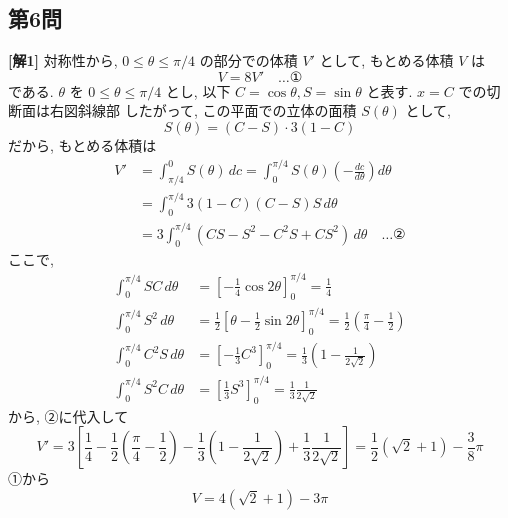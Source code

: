 \documentclass[../main.tex]{subfiles}
\begin{document}
\newpage

\subsection*{第6問}

\noindent
\textbf{[解1]} 対称性から, $0 \le \theta \le \pi/4$ の部分での体積 $V'$ として, もとめる体積 $V$ は
\[
  V = 8V' \quad \dots \text{①}
\]
である. $\theta$ を $0 \le \theta \le \pi/4$ とし, 以下 $C = \cos\theta, S = \sin\theta$ と表す. $x = C$ での切断面は右図斜線部
したがって, この平面での立体の面積 $S(\theta)$ として,
\[
  S(\theta) = (C - S) \cdot 3(1-C)
\]
だから, もとめる体積は
\begin{align*}
  V' &= \int_{\pi/4}^0 S(\theta) \, dc = \int_0^{\pi/4} S(\theta) \left( -\frac{dc}{d\theta} \right) d\theta \\
  &= \int_0^{\pi/4} 3(1-C)(C-S) S \, d\theta \\
  &= 3 \int_0^{\pi/4} (CS - S^2 - C^2 S + CS^2) \, d\theta \quad \dots \text{②}
\end{align*}
ここで,
\begin{align*}
  \int_0^{\pi/4} SC \, d\theta &= \left[ -\frac{1}{4} \cos 2\theta \right]_0^{\pi/4} = \frac{1}{4} \\
  \int_0^{\pi/4} S^2 \, d\theta &= \frac{1}{2} \left[ \theta - \frac{1}{2}\sin 2\theta \right]_0^{\pi/4} = \frac{1}{2}\left(\frac{\pi}{4} - \frac{1}{2}\right) \\
  \int_0^{\pi/4} C^2 S \, d\theta &= \left[ -\frac{1}{3} C^3 \right]_0^{\pi/4} = \frac{1}{3} \left(1 - \frac{1}{2\sqrt{2}}\right) \\
  \int_0^{\pi/4} S^2 C \, d\theta &= \left[ \frac{1}{3} S^3 \right]_0^{\pi/4} = \frac{1}{3} \frac{1}{2\sqrt{2}}
\end{align*}
から, ②に代入して
\[
  V' = 3 \left[ \frac{1}{4} - \frac{1}{2}\left(\frac{\pi}{4} - \frac{1}{2}\right) - \frac{1}{3}\left(1 - \frac{1}{2\sqrt{2}}\right) + \frac{1}{3}\frac{1}{2\sqrt{2}} \right] = \frac{1}{2}(\sqrt{2} + 1) - \frac{3}{8}\pi
\]
①から
\[
  V = 4(\sqrt{2}+1) - 3\pi
\]
\end{document}
